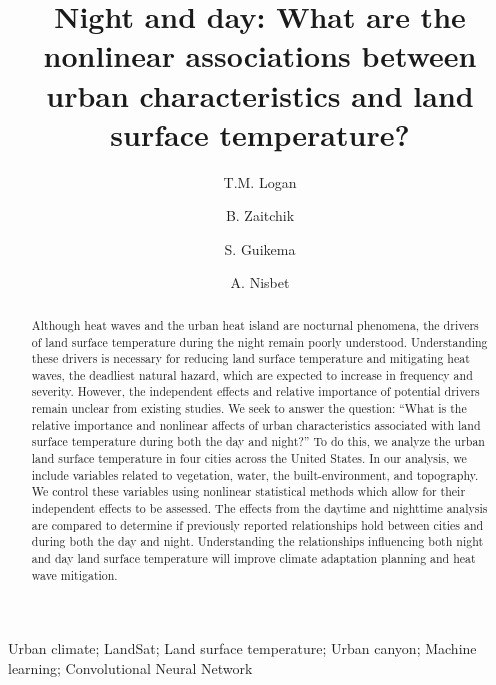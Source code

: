 \documentclass[final,3p,times,twocolumn,sort&compress]{elsarticle}
\begin{document}
\begin{frontmatter}

\title{Night and day: What are the nonlinear associations between urban characteristics and land surface temperature?}

\author[1]{T.M. Logan}

\author[2]{B. Zaitchik}
\author[1]{S. Guikema}
\author[]{A. Nisbet}


\address[1]{Industrial and Operations Engineering, University of Michigan, Ann Arbor, MI}
\address[2]{Earth and Planetary Sciences, Johns Hopkins University, Baltimore, MD}

\begin{abstract}
Although heat waves and the urban heat island are nocturnal phenomena, the drivers of land surface temperature during the night remain poorly understood.
Understanding these drivers is necessary for reducing land surface temperature and mitigating heat waves, the deadliest natural hazard, which are expected to increase in frequency and severity.
However, the independent effects and relative importance of potential drivers remain unclear from existing studies.
We seek to answer the question: ``What is the relative importance and nonlinear affects of urban characteristics associated with land surface temperature during both the day and night?'' 
To do this, we analyze the urban land surface temperature in four cities across the United States.
In our analysis, we include variables related to vegetation, water, the built-environment, and topography. 
We control these variables using nonlinear statistical methods which allow for their independent effects to be assessed.
The effects from the daytime and nighttime analysis are compared to determine if previously reported relationships hold between cities and during both the day and night.
Understanding the relationships influencing both night and day land surface temperature will improve climate adaptation planning and heat wave mitigation.
\end{abstract}

\begin{keyword}
Urban climate; LandSat; Land surface temperature; Urban canyon; Machine learning; Convolutional Neural Network
\end{keyword}

\end{frontmatter}
\end{document}
